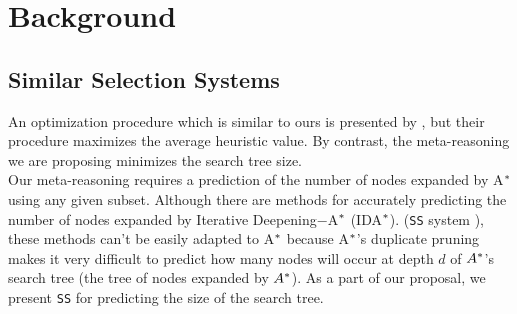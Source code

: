 
 
\chapter{Background}\label{ch:background}

\section{Similar Selection Systems}

\noindent
An optimization procedure which is similar to ours is presented by \cite{raynersss13}, but their procedure maximizes the average heuristic value. By contrast, the meta-reasoning we are proposing minimizes the search tree size.\\

Our meta-reasoning requires a prediction of the number of nodes expanded by A$\sp{*}$ using any given subset. Although there are methods for accurately predicting the number of nodes expanded by Iterative Deepening$-$A$\sp{*}$ \cite{Korf85ida} (IDA$\sp{*}$). (\texttt{SS} system  \cite{lelis2013predicting}), these methods can't be easily adapted to A$\sp{*}$ because A$\sp{*}$'s duplicate pruning makes it very difficult to predict how many nodes will occur at depth $d$ of $A\sp{*}$'s search tree (the tree of nodes expanded by $A\sp{*}$). As a part of our proposal, we present \texttt{SS} for predicting the size of the search tree.

